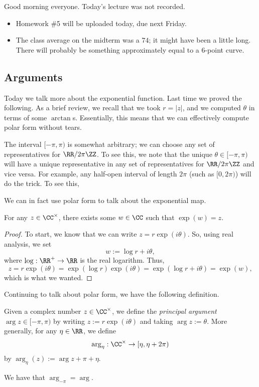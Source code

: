 
Good morning everyone. Today's lecture was not recorded.
\begin{itemize}
	\item Homework \#5 will be uploaded today, due next Friday.
	\item The class average on the midterm was a $74$; it might have been a little long. There will probably be something approximately equal to a $6$-point curve.
\end{itemize}

\subsection{Arguments}
Today we talk more about the exponential function. Last time we proved the following.
\polarform*
\noindent As a brief review, we recall that we took $r=|z|$, and we computed $\theta$ in terms of some $\arctan$s. Essentially, this means that we can effectively compute polar form without tears.
\begin{remark}
	The interval $[-\pi,\pi)$ is somewhat arbitrary; we can choose any set of representatives for $\RR/2\pi\ZZ$. To see this, we note that the unique $\theta\in[-\pi,\pi)$ will have a unique representative in any set of representatives for $\RR/2\pi\ZZ$ and vice versa. For example, any half-open interval of length $2\pi$ (such as $[0,2\pi)$) will do the trick. To see this, 
\end{remark}

We can in fact use polar form to talk about the exponential map.
\begin{corollary} \label{cor:expsurj}
	For any $z\in\CC^\times$, there exists some $w\in\CC$ such that $\exp(w)=z$.
\end{corollary}
\begin{proof}
	To start, we know that we can write $z=r\exp(i\theta)$. So, using real analysis, we set
	\[w:=\log r+i\theta,\]
	where $\log:\RR^+\to\RR$ is the real logarithm. Thus,
	\[z=r\exp(i\theta)=\exp(\log r)\exp(i\theta)=\exp(\log r+i\theta)=\exp(w),\]
	which is what we wanted.
\end{proof}
Continuing to talk about polar form, we have the following definition.
\begin{definition}[Argument]
	Given a complex number $z\in\CC^\times$, we define the \textit{principal argument} $\arg z\in[-\pi,\pi)$ by writing $z:=r\exp(i\theta)$ and taking $\arg z:=\theta$. More generally, for any $\eta\in\RR$, we define
	\[\arg_\eta:\CC^\times\to[\eta,\eta+2\pi)\]
	by $\arg_\eta(z):=\arg z+\pi+\eta$.
\end{definition}
\begin{example}
	We have that $\arg_{-\pi}=\arg$.
\end{example}

